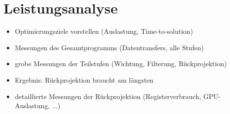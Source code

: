 \chapter{Leistungsanalyse}

\begin{itemize}
    \item Optimierungsziele vorstellen (Auslastung, Time-to-solution)
    \item Messungen des Gesamtprogramms (Datentransfers, alle Stufen)
    \item grobe Messungen der Teilstufen (Wichtung, Filterung, Rückprojektion)
    \item Ergebnis: Rückprojektion braucht am längsten
    \item detaillierte Messungen der Rückprojektion (Registerverbrauch, GPU-Auslastung, ...)
\end{itemize}
